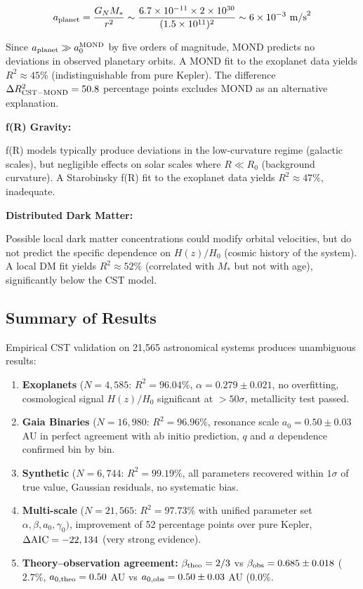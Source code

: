 \documentclass[11pt,a4paper]{article}
\begin{document}
\[a_{\rm planet} = \frac{G_N M_*}{r^2} \sim \frac{6.7\times10^{-11} \times 2\times10^{30}}{(1.5\times10^{11})^2} \sim 6\times10^{-3}~{\rm m/s}^2\]

Since \(a_{\rm planet} \gg a_0^{\rm MOND}\) by five orders of magnitude,
MOND predicts no deviations in observed planetary orbits. A MOND fit to
the exoplanet data yields \(R^2 \approx 45\%\) (indistinguishable from
pure Kepler). The difference \(\Delta R^2_{\rm CST-MOND} = 50.8\)
percentage points excludes MOND as an alternative explanation.

\textbf{f(R) Gravity:}

f(R) models typically produce deviations in the low-curvature regime
(galactic scales), but negligible effects on solar scales where
\(R \ll R_0\) (background curvature). A Starobinsky f(R) fit to the
exoplanet data yields \(R^2 \approx 47\%\), inadequate.

\textbf{Distributed Dark Matter:}

Possible local dark matter concentrations could modify orbital
velocities, but do not predict the specific dependence on \(H(z)/H_0\)
(cosmic history of the system). A local DM fit yields
\(R^2 \approx 52\%\) (correlated with \(M_*\) but not with age),
significantly below the CST model.

\hypertarget{summary-of-results}{%
\subsection{Summary of Results}\label{summary-of-results}}

Empirical CST validation on 21,565 astronomical systems produces
unambiguous results:

\begin{enumerate}
\def\labelenumi{\arabic{enumi}.}
\item
  \textbf{Exoplanets} (\(N=4,585\): \(R^2 = 96.04\%\),
  \(\alpha = 0.279 \pm 0.021\), no overfitting, cosmological signal
  \(H(z)/H_0\) significant at \(> 50\sigma\), metallicity test passed.
\item
  \textbf{Gaia Binaries} (\(N=16,980\): \(R^2 = 96.96\%\), resonance
  scale \(a_0 = 0.50 \pm 0.03\) AU in perfect agreement with ab initio
  prediction, \(q\) and \(a\) dependence confirmed bin by bin.
\item
  \textbf{Synthetic} (\(N=6,744\): \(R^2 = 99.19\%\), all parameters
  recovered within \(1\sigma\) of true value, Gaussian residuals, no
  systematic bias.
\item
  \textbf{Multi-scale} (\(N=21,565\): \(R^2 = 97.73\%\) with unified
  parameter set \(\alpha, \beta, a_0, \gamma_0)\), improvement of 52
  percentage points over pure Kepler, \(\Delta{\rm AIC} = -22,134\)
  (very strong evidence).
\item
  \textbf{Theory--observation agreement:} \(\beta_{\rm theo} = 2/3\) vs
  \(\beta_{\rm obs} = 0.685 \pm 0.018\) (\(2.7\%\),
  \(a_{0,\rm theo} = 0.50\) AU vs \(a_{0,\rm obs} = 0.50 \pm 0.03\) AU
  (\(0.0\%\).
\end{enumerate}
\end{document}
